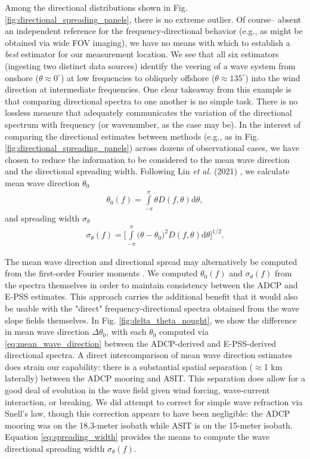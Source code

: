 \documentclass[letterpaper,draftcls,onecolumn]{IEEEtran}
\begin{document}
Among the directional distributions shown in Fig. \ref{fig:directional_spreading_panels}, there is no extreme outlier. Of course-- absent an independent reference for the frequency-directional behavior (e.g., as might be obtained via wide FOV imaging), we have no means with which to establish a \emph{best} estimator for our measurement location. We see that all six estimators (ingesting two distinct data sources) identify the veering of a wave system from onshore ($\theta\approx 0^{\circ}$) at low frequencies to obliquely offshore ($\theta\approx 135^{\circ}$) into the wind direction at intermediate frequencies. One clear takeaway from this example is that comparing directional spectra to one another is no simple task. There is no lossless measure that adequately communicates the variation of the directional spectrum with frequency (or wavenumber, as the case may be). In the interest of comparing  the directional estimates between methods (e.g., as in Fig. \ref{fig:directional_spreading_panels}) across dozens of observational cases, we have chosen to reduce the information to be considered to the mean wave direction and the directional spreading width. Following Lin \emph{et al.} (2021) \cite{lin_estimating_2022}, we calculate mean wave direction $\theta_0$
\begin{align}
	\theta_0(f)=\int\limits_{-\pi}^{\pi}\theta D(f,\theta)\mathrm{d}\theta,
	\label{eq:mean_wave_direction}
\end{align}
\noindent and spreading width $\sigma_\theta$
\begin{align}
	\sigma_\theta(f)=\Bigg[\int\limits_{-\pi}^{\pi}\big(\theta-\theta_0\big)^2 D(f,\theta)\mathrm{d}\theta\Bigg]^{1/2}.
	\label{eq:spreading_width}
\end{align}

\clearpage

The mean wave direction and directional spread may alternatively be computed from the first-order Fourier moments \cite{earle_nondirectional_2003}. We computed $\theta_0(f)$ and $\sigma_\theta(f)$ from the spectra themselves in order to maintain consistency between the ADCP and E-PSS estimates. This approach carries the additional benefit that it would also be usable with the "direct" frequency-directional spectra obtained from the wave slope fields themselves. In Fig. \ref{fig:delta_theta_nought}, we show the difference in mean wave direction $\Delta\theta_0$, with each $\theta_0$ computed via \eqref{eq:mean_wave_direction} between the ADCP-derived and E-PSS-derived directional spectra. A direct intercomparison of mean wave direction estimates does strain our capability: there is a substantial spatial separation ($\approx$1 km laterally) between the ADCP mooring and ASIT. This separation does allow for a good deal of evolution in the wave field given wind forcing, wave-current interaction, or breaking. We did attempt to correct for simple wave refraction via Snell's law, though this correction appears to have been negligible: the ADCP mooring was on the 18.3-meter isobath while ASIT is on the 15-meter isobath. Equation \eqref{eq:spreading_width} provides the means to compute the wave directional spreading width $\sigma_\theta(f)$.
\end{document}
